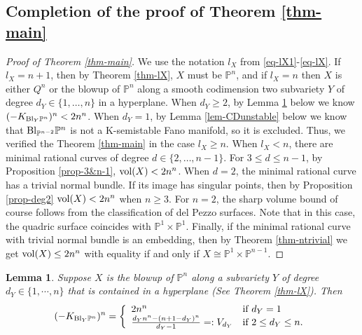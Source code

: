 \documentclass[12pt]{amsart}
\newtheorem{lem}[thm]{Lemma}
\theoremstyle{definition}
\def\bl{{\rm Bl}}
\def\vol{{\rm vol}}
\newcommand{\IP}{{\mathbb P}}
\begin{document}
\subsection{Completion of the proof of Theorem \ref{thm-main}}
\begin{proof}[Proof of Theorem \ref{thm-main}]
We use the notation $l_X$ from \eqref{eq-lX1}-\eqref{eq-lX}.
If $l_X=n+1$, then by Theorem \ref{thm-lX}, $X$ must be $\IP^n$, and if $l_X=n$ then $X$ is either $Q^n$ or the blowup of $\IP^n$ along a smooth codimension two subvariety $Y$ of degree $d_Y\in \{1, \dots, n\}$ in a hyperplane. When $d_Y\geq 2$, by Lemma \ref{lem:CDvolume} below we know $(-K_{\bl_Y \IP^n})^n<2n^n$. When $d_Y=1$, by Lemma \ref{lem-CDunstable} below we know that $\bl_{\IP^{n-2}}\IP^n$ is not a K-semistable Fano manifold, so it is excluded. Thus, we verified the Theorem \ref{thm-main} in the case $l_X\ge n$. When $l_X<n$, there are minimal rational curves of degree $d\in \{2,\dots, n-1\}$. For $3\le d\le n-1$, 
    by Proposition \ref{prop-3&n-1}, $\vol(X)<2n^n$. When $d=2$, the minimal rational curve has a trivial normal bundle. If its image has singular points, then by Proposition \ref{prop-deg2} $\vol(X)<2n^n$ when $n\ge 3$. For $n=2$, the sharp volume bound of course follows from the classification of del Pezzo surfaces. Note that in this case, the quadric surface coincides with $\mathbb{P}^1\times \mathbb{P}^1$. 
    Finally, if the minimal rational curve with trivial normal bundle is an embedding, then by Theorem \ref{thm-ntrivial} we get $\vol(X)\le 2n^n$ with equality if and only if $X\cong \IP^1\times \IP^{n-1}$. 
\end{proof}
\begin{lem}\label{lem:CDvolume}
    Suppose $X$ is the blowup of $\IP^n$ along a subvariety $Y$ of degree $d_Y\in \{1,\cdots,n\}$ that is contained in a hyperplane (See Theorem \ref{thm-lX}). Then
    \begin{equation*}
        (-K_{\bl_Y \IP^n})^n=\left\{\begin{array}{ll}
        2n^n & \text{if } d_Y=1\\
        \frac{d_Y n^n-(n+1-d_Y)^n}{d_Y-1}=:V_{d_Y} & \text{if } 2\le d_Y\le n.
        \end{array}
        \right.
    \end{equation*}
\end{lem}
\end{document}
